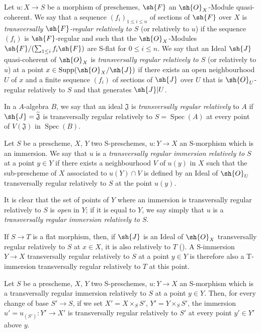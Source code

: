 \begin{definition}[19.2.1]
\label{IV.19.2.1}
Let $u:X\to S$ be a morphism of preschemes, $\sh{F}$ an $\sh{O}_X$-Module quasi-coherent.
We say that a sequence $(f_i)_{1\leq i\leq n}$ of sections of $\sh{F}$ over $X$ is \emph{transversally $\sh{F}$-regular relatively to $S$} (or relatively to $u$) if the sequence $(f_i)$ is $\sh{F}$-regular and such that the $\sh{O}_X$-Modules $\sh{F}/(\sum_{1\leq i}f_i\sh{F})$ are S-flat for $0\leq i\leq n$.
We say that an Ideal $\sh{J}$ quasi-coherent of $\sh{O}_X$ is \emph{transversally regular relatively to $S$} (or relatively to $u$) at a point $x\in\operatorname{Supp}(\sh{O}_X/\sh{J})$ if there exists an open neighbourhood $U$ of $x$ and a finite sequence $(f_i)$ of sections of $\sh{J}$ over $U$ that is $\sh{O}_U$-regular relatively to $S$ and that generates $\sh{J}|U$.

In a $A$-algebra $B$, we say that an ideal $\mathfrak{J}$ is \emph{transversally regular relatively} to $A$ if $\sh{J}=\widetilde{\mathfrak{J}}$ is transversally regular relatively to $S=\operatorname{Spec}(A)$ at every point of $V(\mathfrak{J})$ in $\operatorname{Spec}(B)$.
\end{definition}

\begin{definition}[19.2.2]
\label{IV.19.2.2}
Let $S$ be a prescheme, $X$, $Y$ two S-preschemes, $u:Y\to X$ an S-morphism which is an immersion.
We say that $u$ is a \emph{transversally regular immersion relatively to $S$} at a point $y\in Y$ if there exists a neighbourhood $V$ of $u(y)$ in $X$ such that the sub-prescheme of $X$ associated to $u(Y)\cap V$ is defined by an Ideal of $\sh{O}_U$ transversally regular relatively to $S$ at the point $u(y)$.

It is clear that the set of points of $Y$ where an immersion is transversally regular relatively to $S$ is \emph{open} in $Y$; if it is equal to $Y$, we say simply that $u$ is a \emph{transversally regular immersion relatively to $S$}.

If $S\to T$ is a flat morphism, then, if $\sh{J}$ is an Ideal of $\sh{O}_X$ transversally regular relatively to $S$ at $x\in X$, it is also relatively to $T$ ().
A S-immersion $Y\to X$ transversally regular relatively to $S$ at a point $y\in Y$ is therefore also a T-immersion transversally regular relatively to $T$ at this point.
\end{definition}

\begin{proposition}[19.2.3]
\label{IV.19.2.3}
Let $S$ be a prescheme, $X$, $Y$ two S-preschemes, $u:Y\to X$ an S-morphism which is a transversally regular immersion relatively to $S$ at a point $y\in Y$.
Then, for every change of base $S'\to S$, if we set $X'=X\times_S S'$, $Y'=Y\times_S S'$, the immersion $u'=u_{(S')}:Y'\to X'$ is transversally regular relatively to $S'$ at every point $y'\in Y'$ above $y$.
\end{proposition}

